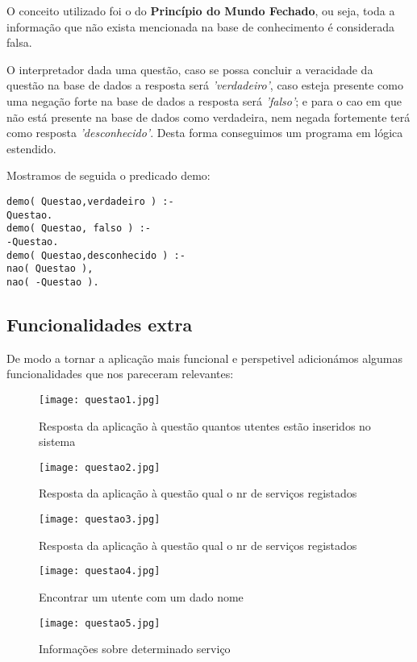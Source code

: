 O conceito utilizado foi o do \textbf{Princípio do Mundo Fechado}, ou seja, toda a informação que não exista mencionada na base de conhecimento é considerada falsa. 

O interpretador dada uma questão, caso se possa concluir a veracidade da questão na base de dados a resposta será \textit{'verdadeiro'}, caso esteja presente como uma negação forte na base de dados a resposta será \textit{'falso'}; e para o cao em que não está presente na base de dados como verdadeira, nem negada fortemente terá como resposta \textit{'desconhecido'}. Desta forma conseguimos um programa em lógica estendido. 

Mostramos de seguida o predicado demo: 
\begin{verbatim}
demo( Questao,verdadeiro ) :-
Questao.
demo( Questao, falso ) :-
-Questao.
demo( Questao,desconhecido ) :-
nao( Questao ),
nao( -Questao ).
\end{verbatim}

\subsection{Funcionalidades extra}
De modo a tornar a aplicação mais funcional e perspetivel adicionámos algumas funcionalidades que nos pareceram relevantes: 

\begin{figure}[<+h+>]
	\centering
	\texttt{[image: questao1.jpg]}
	\caption{Resposta da aplicação à questão quantos utentes estão inseridos no sistema}
\end{figure}

\begin{figure}[<+h+>]
	\centering
	\texttt{[image: questao2.jpg]}
	\caption{Resposta da aplicação à questão qual o nr de serviços registados}
\end{figure}

\begin{figure}[<+h+>]
	\centering
	\texttt{[image: questao3.jpg]}
	\caption{Resposta da aplicação à questão qual o nr de serviços registados}
\end{figure}

\begin{figure}[<+ht+>]
	\centering
	\texttt{[image: questao4.jpg]}
	\caption{Encontrar um utente com um dado nome }
\end{figure}

\begin{figure}[<+ht+>]
	\centering
	\texttt{[image: questao5.jpg]}
	\caption{Informações sobre determinado serviço}
\end{figure}

